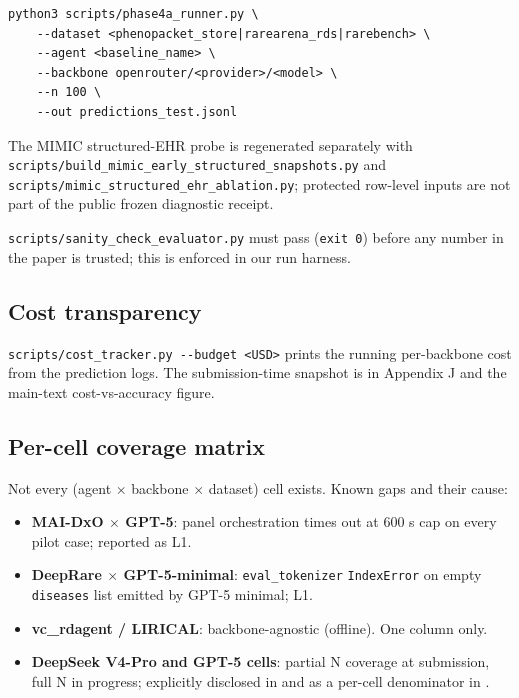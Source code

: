 \begin{Verbatim}
python3 scripts/phase4a_runner.py \
    --dataset <phenopacket_store|rarearena_rds|rarebench> \
    --agent <baseline_name> \
    --backbone openrouter/<provider>/<model> \
    --n 100 \
    --out predictions_test.jsonl
\end{Verbatim}

The MIMIC structured-EHR probe is regenerated separately with
\texttt{scripts/build\_mimic\_early\_structured\_snapshots.py} and
\texttt{scripts/mimic\_structured\_ehr\_ablation.py}; protected row-level inputs are not
part of the public frozen diagnostic receipt.

\texttt{scripts/sanity\_check\_evaluator.py} must pass (\texttt{exit\ 0}) before any
number in the paper is trusted; this is enforced in our run harness.

\subsection{Cost transparency}\label{cost-transparency}

\texttt{scripts/cost\_tracker.py\ -\/-budget\ \textless{}USD\textgreater{}} prints the running per-backbone
cost from the prediction logs. The submission-time snapshot is in
Appendix J and the main-text cost-vs-accuracy figure.

\subsection{Per-cell coverage matrix}\label{per-cell-coverage-matrix}

Not every (agent \ensuremath{\times} backbone \ensuremath{\times} dataset) cell exists. Known gaps and
their cause:

\begin{itemize}
\tightlist
\item
  \textbf{MAI-DxO \ensuremath{\times} GPT-5}: panel orchestration times out at 600 s cap on
  every pilot case; reported as  L1.
\item
  \textbf{DeepRare \ensuremath{\times} GPT-5-minimal}: \texttt{eval\_tokenizer} \texttt{IndexError} on
  empty \texttt{diseases} list emitted by GPT-5 minimal;  L1.
\item
  \textbf{vc\_rdagent / LIRICAL}: backbone-agnostic (offline). One column
  only.
\item
  \textbf{DeepSeek V4-Pro and GPT-5 cells}: partial N coverage at
  submission, full N in progress; explicitly disclosed in  and as
  a per-cell denominator in \Cref{tbl:main}.
\end{itemize}

